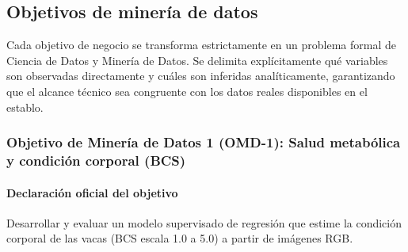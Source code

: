 \subsection{Objetivos de minería de datos}

Cada objetivo de negocio se transforma estrictamente en un problema formal de Ciencia de Datos y Minería de Datos. Se delimita explícitamente qué variables son observadas directamente y cuáles son inferidas analíticamente, garantizando que el alcance técnico sea congruente con los datos reales disponibles en el establo.

\subsubsection{Objetivo de Minería de Datos 1 (OMD-1): Salud metabólica y condición corporal (BCS)}

\paragraph{Declaración oficial del objetivo}
Desarrollar y evaluar un modelo supervisado de regresión que estime la condición corporal de las vacas (BCS escala 1.0 a 5.0) a partir de imágenes RGB.
